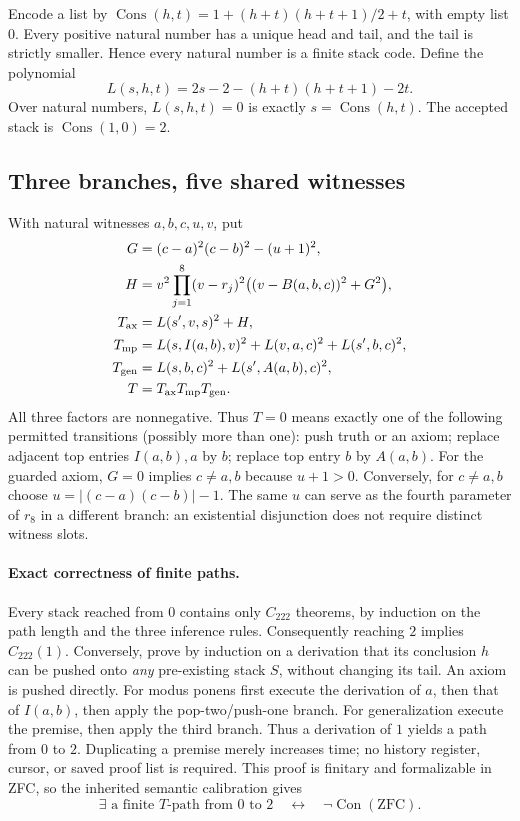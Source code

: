 Encode a list by $\operatorname{Cons}(h,t)=1+(h+t)(h+t+1)/2+t$,
with empty list $0$. Every positive natural number has a unique head and
tail, and the tail is strictly smaller. Hence every natural number is a
finite stack code. Define the polynomial
\[
 L(s,h,t)=2s-2-(h+t)(h+t+1)-2t.
\]
Over natural numbers, $L(s,h,t)=0$ is exactly $s=\operatorname{Cons}(h,t)$.
The accepted stack is $\operatorname{Cons}(1,0)=2$.

\subsection{Three branches, five shared witnesses}
With natural witnesses $a,b,c,u,v$, put
\begin{align*}
 G&=(c-a)^2(c-b)^2-(u+1)^2,\\
 H&=v^2\prod_{j=1}^{8}(v-r_j)^2\bigl((v-B(a,b,c))^2+G^2\bigr),\\
 T_{\rm ax}&=L(s',v,s)^2+H,\\
 T_{\rm mp}&=L(s,I(a,b),v)^2+L(v,a,c)^2+L(s',b,c)^2,\\
 T_{\rm gen}&=L(s,b,c)^2+L(s',A(a,b),c)^2,\\
 T&=T_{\rm ax}T_{\rm mp}T_{\rm gen}.
\end{align*}
All three factors are nonnegative. Thus $T=0$ means exactly one of the
following permitted transitions (possibly more than one): push truth or an
axiom; replace adjacent top entries $I(a,b),a$ by $b$; replace top entry $b$
by $A(a,b)$. For the guarded axiom, $G=0$ implies $c\ne a,b$ because $u+1>0$.
Conversely, for $c\ne a,b$ choose $u=|(c-a)(c-b)|-1$.
The same $u$ can serve as the fourth parameter of $r_8$ in a different
branch: an existential disjunction does not require distinct witness slots.

\paragraph{Exact correctness of finite paths.}
Every stack reached from $0$ contains only $C_{222}$ theorems, by induction
on the path length and the three inference rules. Consequently reaching
$2$ implies $C_{222}(1)$. Conversely, prove by induction on a derivation
that its conclusion $h$ can be pushed onto \emph{any} pre-existing stack
$S$, without changing its tail. An axiom is pushed directly. For modus
ponens first execute the derivation of $a$, then that of $I(a,b)$, then
apply the pop-two/push-one branch. For generalization execute the premise,
then apply the third branch. Thus a derivation of $1$ yields a path from
$0$ to $2$. Duplicating a premise merely increases time; no history register,
cursor, or saved proof list is required. This proof is finitary and
formalizable in ZFC, so the inherited semantic calibration gives
\[
 \exists\text{ a finite }T\text{-path from }0\text{ to }2
 \quad\longleftrightarrow\quad \neg\operatorname{Con}(\mathrm{ZFC}).
\]

